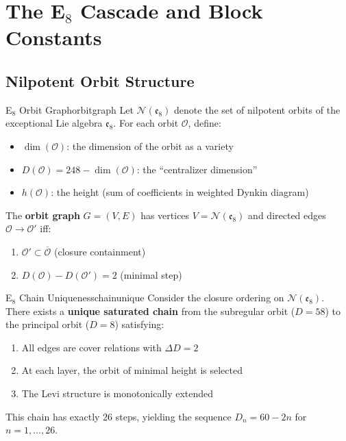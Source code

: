 \section{\texorpdfstring{The E$_8$ Cascade and Block Constants}{The E8 Cascade and Block Constants}}
\label{sec:e8}

\subsection{Nilpotent Orbit Structure}

\begin{definition}{E$_8$ Orbit Graph}{orbitgraph}
Let $\mathcal{N}(\mathfrak{e}_8)$ denote the set of nilpotent orbits of the 
exceptional Lie algebra $\mathfrak{e}_8$. For each orbit $\mathcal{O}$, define:
\begin{itemize}[leftmargin=1.5em, topsep=2pt, itemsep=1pt]
    \item $\dim(\mathcal{O})$: the dimension of the orbit as a variety
    \item $D(\mathcal{O}) = 248 - \dim(\mathcal{O})$: the ``centralizer dimension''
    \item $h(\mathcal{O})$: the height (sum of coefficients in weighted Dynkin diagram)
\end{itemize}
The \textbf{orbit graph} $G = (V, E)$ has vertices $V = \mathcal{N}(\mathfrak{e}_8)$ 
and directed edges $\mathcal{O} \to \mathcal{O}'$ iff:
\begin{enumerate}[leftmargin=1.5em, topsep=2pt, itemsep=1pt]
    \item $\mathcal{O}' \subset \overline{\mathcal{O}}$ (closure containment)
    \item $D(\mathcal{O}) - D(\mathcal{O}') = 2$ (minimal step)
\end{enumerate}
\end{definition}

\begin{theorem}{E$_8$ Chain Uniqueness}{chainunique}
Consider the closure ordering on $\mathcal{N}(\mathfrak{e}_8)$. There exists a 
\textbf{unique saturated chain} from the subregular orbit ($D = 58$) to the 
principal orbit ($D = 8$) satisfying:
\begin{enumerate}[leftmargin=1.5em, topsep=2pt, itemsep=1pt]
    \item All edges are cover relations with $\Delta D = 2$
    \item At each layer, the orbit of minimal height is selected
    \item The Levi structure is monotonically extended
\end{enumerate}
This chain has exactly 26 steps, yielding the sequence $D_n = 60 - 2n$ for $n = 1, \ldots, 26$.
\end{theorem}

